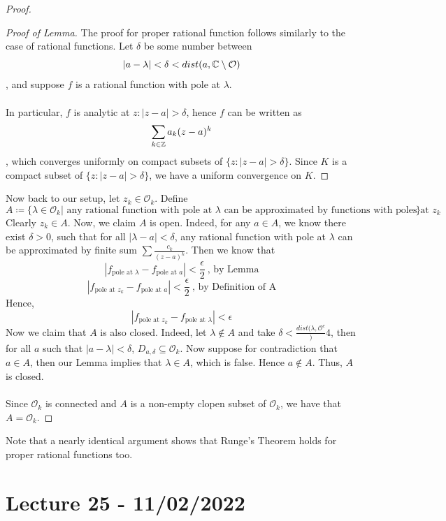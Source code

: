 \documentclass{article}
\begin{document}
\begin{proof}
\begin{proof}[Proof of Lemma]
    The proof for proper rational function follows similarly to the case of rational functions. Let $\delta$ be some number between
    \[|a - \lambda| < \delta < dist(a, \mathbb{C} \setminus \mathcal{O})\]
    , and suppose $f$ is a rational function with pole at $\lambda$.\\\\
    In particular, $f$ is analytic at $z: |z - a| > \delta$, hence $f$ can be written as
    \[\sum_{k \in \mathbb{Z}} a_k (z - a)^k\]
    , which converges uniformly on compact subsets of $\{z: |z - a| > \delta\}$. Since $K$ is a compact subset of $\{z: |z - a| > \delta\}$, we have a uniform convergence on $K$.
    \end{proof}
Now back to our setup, let $z_k \in \mathcal{O}_k$. Define
\[A \coloneqq \{\lambda \in \mathcal{O}_k | \text{ any rational function with pole at $\lambda$ can be approximated by functions with poles at $z_k$}\}\]
Clearly $z_k \in A$. Now, we claim $A$ is open. Indeed, for any $a \in A$, we know there exist $\delta > 0$, such that for all $|\lambda - a| < \delta$, any rational function with pole at $\lambda$ can be approximated by finite sum $\sum \frac{c_k}{(z - a)^k}$. Then we know that
\[|f_{\text{pole at $\lambda$}} - f_{\text{pole at $a$}}| < \frac{\epsilon}{2}\ \text{, by Lemma}\]
\[|f_{\text{pole at $z_k$}} - f_{\text{pole at $a$}}| < \frac{\epsilon}{2}\ \text{, by Definition of A}\]
Hence, 
\[|f_{\text{pole at $z_k$}} - f_{\text{pole at $\lambda$}}| < \epsilon\]
Now we claim that $A$ is also closed. Indeed, let $\lambda \notin A$ and take $\delta < \frac{dist(\lambda, \mathcal{O}^c}){4}$, then for all $a$ such that $|a - \lambda| < \delta$, $D_{a, \delta} \subseteq \mathcal{O}_k$. Now suppose for contradiction that $a \in A$, then our Lemma implies that $\lambda \in A$, which is false. Hence $a \notin A$. Thus, $A$ is closed.\\\\
Since $\mathcal{O}_k$ is connected and $A$ is a non-empty clopen subset of $\mathcal{O}_k$, we have that $A = \mathcal{O}_k$.
\end{proof}

\begin{remark}
    Note that a nearly identical argument shows that Runge's Theorem holds for proper rational functions too.
\end{remark}

\section{Lecture 25 - 11/02/2022}
\end{document}
